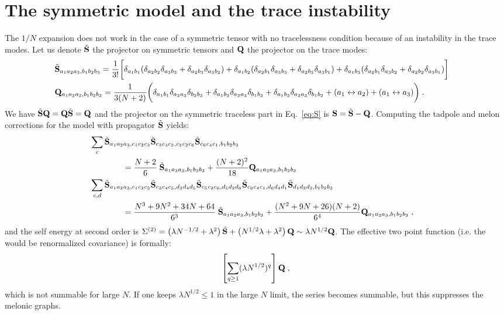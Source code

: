 \documentclass[10pt]{article}
\theoremstyle{plain}
\theoremstyle{definition}
\newcommand{\bQ}{ {\bf Q} }
\newcommand{\bS}{ {\bf S} }
\begin{document}
    
\section{The symmetric model and the trace instability}\label{app:symmodel}

The $1/N$ expansion does not work in the case of a symmetric tensor with no tracelessness condition because of an instability in the trace modes.
  Let us denote $\tilde \bS$ the projector on symmetric tensors and $\bQ$ the projector on the trace modes:
 \begin{align*}
& \tilde \bS_{a_1a_2a_3, b_1b_2b_3}  =  \frac{1}{3!} \bigg[ 
  \delta_{a_1b_1} ( \delta_{a_2b_2} \delta_{a_3 b_3} + \delta_{a_2b_3} \delta_{a_3b_2}  ) + 
         \delta_{a_1b_2} (  \delta_{a_2b_1} \delta_{a_3 b_3} +\delta_{a_2b_3} \delta_{a_3b_1}  )  +
      \delta_{a_1b_3} (\delta_{a_2 b_1} \delta_{a_3 b_2} +  \delta_{a_2 b_2} \delta_{a_3 b_1} )   \bigg] \crcr
& \bQ_{a_1a_2a_3, b_1b_2b_3} = \frac{1}{3( N + 2) } \bigg( 
   \delta_{a_1b_1} \delta_{a_2a_3} \delta_{b_2b_3} + \delta_{a_1b_2} \delta_{a_2a_3} \delta_{b_1b_3} + \delta_{a_1b_3} \delta_{a_2a_3} \delta_{b_1b_2} + (a_1 \leftrightarrow  a_2) + (a_1 \leftrightarrow  a_3)
 \bigg)\; .
\end{align*}
We have $\tilde \bS \bQ= \bQ \tilde \bS = \bQ$ and the projector on the symmetric traceless part in Eq.~\eqref{eq:S} is $ \bS = \tilde \bS - \bQ $. 
Computing the tadpole and melon corrections for the model with propagator $\tilde \bS$ yields:
\begin{align*}
&  \sum_{c} \tilde\bS_{a_1a_2a_3, c_1c_2c_3} \tilde \bS_{c_3c_4c_5, c_5c_2c_6} \tilde \bS_{c_6 c_4 c_1,b_1b_2b_3} \crcr
 & \qquad \qquad =  \frac{N+2}{ 6 }  \; \tilde \bS_{a_1a_2a_3, b_1b_2b_3} + \frac{(N+2)^2}{18}  \bQ_{a_1a_2a_3, b_1b_2b_3} \crcr
& \sum_{c,d} \tilde \bS_{a_1a_2a_3, c_1 c_2c_3}   \tilde \bS_{c_3 c_4 c_5, d_3 d_4 d_5 } \tilde \bS_{c_5c_2 c_6 , d_5 d_2 d_6 } \tilde \bS_{c_6c_4c_1 ,  d_6 d_4 d_1  }\tilde \bS_{ d_1 d_2 d_3 , b_1b_2b_3}  \crcr
 & \qquad \qquad = \frac{ N^3 + 9N^2 +34N +64 }{6^3} \; \tilde \bS_{a_1a_2a_3, b_1b_2b_3} +  \frac{ ( N^2+9N+26 ) (N+2)}{6^4}    \bQ_{a_1a_2a_3, b_1b_2b_3} \;,
\end{align*} 
and the self energy at second order is 
$\Sigma^{(2)}  =  \left(   \lambda  N^{ - 1/2}  +    \lambda^2  \right) \tilde \bS +   \left(    N^{1/2} \lambda  +  \lambda^2  \right)  \bQ  \sim  \lambda N^{1/2} \bQ$.
The effective two point function (i.e. the would be renormalized covariance) is formally:
\[  \left[ \sum_{q\ge 1} (\lambda N^{1/2})^q  \right] {\bf Q}\;, \]
which is not summable for large $N$. If one keeps $ \lambda N^{1/2}\le 1$ in the large $N$ limit, the series becomes summable, but this suppresses the melonic graphs. 
\end{document}
